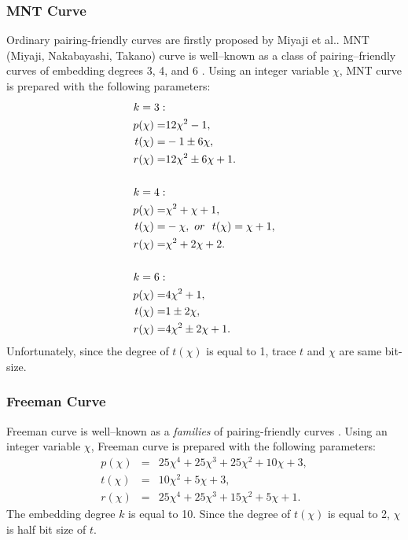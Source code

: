 \subsubsection{MNT Curve}
Ordinary pairing-friendly curves are firstly proposed by Miyaji et al.\cite{MNT}.
MNT (Miyaji, Nakabayashi, Takano) curve is well--known as a class of pairing--friendly curves of embedding degrees 3, 4, and 6 \cite{MNT}. Using an integer variable $\chi$, MNT curve is prepared with the following parameters:
\begin{align*}
k=3:&\notag\\
 p(\chi) = & 12\chi^2-1,\\
 t(\chi) = & -1\pm6\chi,\\
 r(\chi) = & 12\chi^2\pm6\chi+1.\\
 \\
k=4:&\notag\\
 p(\chi) = & \chi^2+\chi+1,\\
 t(\chi) = & -\chi,\ or\ \  t(\chi) = \chi+1, \\
 r(\chi) = & \chi^2+2\chi+2.\\
 \\
k=6:&\notag\\
 p(\chi) = & 4\chi^2+1,\\
 t(\chi) = & 1\pm 2\chi,\\
 r(\chi) = & 4\chi^2\pm2\chi+1.
\end{align*}
Unfortunately, since the degree of $t(\chi)$ is equal to 1, trace $t$ and $\chi$ are same bit-size. 

\subsubsection{Freeman Curve}
Freeman curve is well--known as a {\it families} of pairing-friendly curves \cite{FreemanPDF}. Using an integer variable $\chi$, Freeman curve is prepared with the following parameters:
\begin{eqnarray*}
p(\chi) & = & 25\chi^4+25\chi^3+25\chi^2+10\chi+3, \\
t(\chi) & = & 10\chi^2+5\chi+3, \\
r(\chi) & = & 25\chi^4+25\chi^3+15\chi^2+5\chi+1.
\end{eqnarray*}
The embedding degree $k$ is equal to 10.
Since the degree of $t(\chi)$ is equal to 2, $\chi$ is half bit size of $t$. 

